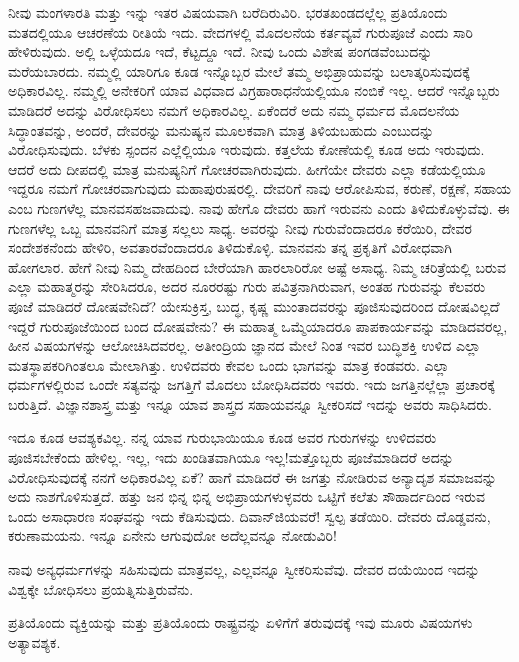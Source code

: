 ನೀವು ಮಂಗಳಾರತಿ ಮತ್ತು ಇನ್ನು ಇತರ ವಿಷಯವಾಗಿ ಬರೆದಿರುವಿರಿ. ಭರತಖಂಡದಲ್ಲೆಲ್ಲ ಪ್ರತಿಯೊಂದು ಮತದಲ್ಲಿಯೂ ಆಚರಣೆಯ ರೀತಿಯೆ ಇದು. ವೇದಗಳಲ್ಲಿ ಮೊದಲನೆಯ ಕರ್ತವ್ಯವೆ ಗುರುಪೂಜೆ ಎಂದು ಸಾರಿ ಹೇಳಿರುವುದು. ಅಲ್ಲಿ ಒಳ್ಳೆಯದೂ ಇದೆ, ಕೆಟ್ಟದ್ದೂ ಇದೆ. ನೀವು ಒಂದು ವಿಶೇಷ ಪಂಗಡವೆಂಬುದನ್ನು ಮರೆಯಬಾರದು. ನಮ್ಮಲ್ಲಿ ಯಾರಿಗೂ ಕೂಡ ಇನ್ನೊಬ್ಬರ ಮೇಲೆ ತಮ್ಮ ಅಭಿಪ್ರಾಯವನ್ನು ಬಲಾತ್ಕರಿಸು\-ವುದಕ್ಕೆ ಅಧಿಕಾರವಿಲ್ಲ. ನಮ್ಮಲ್ಲಿ ಅನೇಕರಿಗೆ ಯಾವ ವಿಧವಾದ ವಿಗ್ರಹಾರಾಧನೆಯಲ್ಲಿಯೂ ನಂಬಿಕೆ ಇಲ್ಲ. ಆದರೆ ಇನ್ನೊಬ್ಬರು ಮಾಡಿದರೆ ಅದನ್ನು ವಿರೋಧಿಸಲು ನಮಗೆ ಅಧಿಕಾರವಿಲ್ಲ. ಏಕೆಂದರೆ ಅದು ನಮ್ಮ ಧರ್ಮದ ಮೊದಲನೆಯ ಸಿದ್ಧಾಂತವನ್ನು, ಅಂದರೆ, ದೇವರನ್ನು ಮನುಷ್ಯನ ಮೂಲಕವಾಗಿ ಮಾತ್ರ ತಿಳಿಯಬಹುದು ಎಂಬುದನ್ನು ವಿರೋಧಿಸುವುದು. ಬೆಳಕು ಸ್ಪಂದನ ಎಲ್ಲೆಲ್ಲಿಯೂ ಇರುವುದು. ಕತ್ತಲೆಯ ಕೋಣೆಯಲ್ಲಿ ಕೂಡ ಅದು ಇರುವುದು. ಆದರೆ ಅದು ದೀಪದಲ್ಲಿ ಮಾತ್ರ ಮನುಷ್ಯನಿಗೆ ಗೋಚರವಾಗಿರುವುದು. ಹೀಗೆಯೇ ದೇವರು ಎಲ್ಲಾ ಕಡೆಯಲ್ಲಿಯೂ ಇದ್ದರೂ ನಮಗೆ ಗೋಚರವಾಗುವುದು ಮಹಾಪುರುಷರಲ್ಲಿ. ದೇವರಿಗೆ ನಾವು ಆರೋಪಿಸುವ, ಕರುಣೆ, ರಕ್ಷಣೆ, ಸಹಾಯ ಎಂಬ ಗುಣಗಳೆಲ್ಲ ಮಾನವಸಹಜವಾದುವು. ನಾವು ಹೇಗೊ ದೇವರು ಹಾಗೆ ಇರುವನು ಎಂದು ತಿಳಿದುಕೊಳ್ಳುವೆವು. ಈ ಗುಣಗಳೆಲ್ಲ ಒಬ್ಬ ಮಾನವನಿಗೆ ಮಾತ್ರ ಸಲ್ಲಲು ಸಾಧ್ಯ. ಅವರನ್ನು ನೀವು ಗುರುವೆಂದಾದರೂ ಕರೆಯಿರಿ, ದೇವರ ಸಂದೇಶಕನೆಂದು ಹೇಳಿರಿ, ಅವತಾರವೆಂದಾದರೂ ತಿಳಿದುಕೊಳ್ಳಿ. ಮಾನವನು ತನ್ನ ಪ್ರಕೃತಿಗೆ ವಿರೋಧವಾಗಿ ಹೋಗಲಾರ. ಹೇಗೆ ನೀವು ನಿಮ್ಮ ದೇಹದಿಂದ ಬೇರೆಯಾಗಿ ಹಾರಲಾರಿರೋ ಅಷ್ಟೆ ಅಸಾಧ್ಯ. ನಿಮ್ಮ ಚರಿತ್ರೆಯಲ್ಲಿ ಬರುವ ಎಲ್ಲಾ ಮಹಾತ್ಮರನ್ನು ಸೇರಿಸಿದರೂ, ಅದರ ನೂರರಷ್ಟು ಗುರು ಪವಿತ್ರನಾಗಿರುವಾಗ, ಅಂತಹ ಗುರುವನ್ನು ಕೆಲವರು ಪೂಜೆ ಮಾಡಿದರೆ ದೋಷವೇನಿದೆ? ಯೇಸುಕ್ರಿಸ್ತ, ಬುದ್ಧ, ಕೃಷ್ಣ ಮುಂತಾದವರನ್ನು ಪೂಜಿಸುವುದರಿಂದ ದೋಷವಿಲ್ಲದೆ ಇದ್ದರೆ ಗುರುಪೂಜೆಯಿಂದ ಬಂದ ದೋಷವೇನು? ಈ ಮಹಾತ್ಮ ಒಮ್ಮೆಯಾದರೂ ಪಾಪಕಾರ್ಯವನ್ನು ಮಾಡಿದವರಲ್ಲ, ಹೀನ ವಿಷಯಗಳನ್ನು ಆಲೋಚಿಸಿದವರಲ್ಲ. ಅತೀಂದ್ರಿಯ ಜ್ಞಾನದ ಮೇಲೆ ನಿಂತ ಇವರ ಬುದ್ಧಿಶಕ್ತಿ ಉಳಿದ ಎಲ್ಲಾ ಮತಸ್ಥಾಪಕರಿಗಿಂತಲೂ ಮೇಲಾಗಿತ್ತು. ಉಳಿದವರು ಕೇವಲ ಒಂದು ಭಾಗವನ್ನು ಮಾತ್ರ ಕಂಡವರು. ಎಲ್ಲಾ ಧರ್ಮಗಳಲ್ಲಿರುವ ಒಂದೇ ಸತ್ಯವನ್ನು ಜಗತ್ತಿಗೆ ಮೊದಲು ಬೋಧಿಸಿದವರು ಇವರು. ಇದು ಜಗತ್ತಿನಲ್ಲೆಲ್ಲಾ ಪ್ರಚಾರಕ್ಕೆ ಬರುತ್ತಿದೆ. ವಿಜ್ಞಾನಶಾಸ್ತ್ರ ಮತ್ತು ಇನ್ನೂ ಯಾವ ಶಾಸ್ತ್ರದ ಸಹಾಯವನ್ನೂ ಸ್ವೀಕರಿಸದೆ ಇದನ್ನು ಅವರು ಸಾಧಿಸಿದರು.

ಇದೂ ಕೂಡ ಆವಶ್ಯಕವಿಲ್ಲ. ನನ್ನ ಯಾವ ಗುರುಭಾಯಿಯೂ ಕೂಡ ಅವರ ಗುರುಗಳನ್ನು ಉಳಿದವರು ಪೂಜಿಸಬೇಕೆಂದು ಹೇಳಿಲ್ಲ. ಇಲ್ಲ, ಇದು ಖಂಡಿತವಾಗಿಯೂ ಇಲ್ಲ!ಮತ್ತೊಬ್ಬರು ಪೂಜೆಮಾಡಿದರೆ ಅದನ್ನು ವಿರೋಧಿಸುವುದಕ್ಕೆ ನನಗೆ ಅಧಿಕಾರವಿಲ್ಲ ಏಕೆ? ಹಾಗೆ ಮಾಡಿದರೆ ಈ ಜಗತ್ತು ನೋಡಿರುವ ಅನ್ಯಾದೃಶ ಸಮಾಜವನ್ನು ಅದು ನಾಶಗೊಳಿಸುತ್ತದೆ. ಹತ್ತು ಜನ ಭಿನ್ನ ಭಿನ್ನ ಅಭಿಪ್ರಾಯಗಳುಳ್ಳವರು ಒಟ್ಟಿಗೆ ಕಲೆತು ಸೌಹಾರ್ದದಿಂದ ಇರುವ ಒಂದು ಅಸಾಧಾರಣ ಸಂಘವನ್ನು ಇದು ಕೆಡಿಸುವುದು. ದಿವಾನ್‌ಜಿಯವರೆ! ಸ್ವಲ್ಪ ತಡೆಯಿರಿ. ದೇವರು ದೊಡ್ಡವನು, ಕರುಣಾಮಯನು. ಇನ್ನೂ ಏನೇನು ಆಗುವುದೋ ಅದೆಲ್ಲವನ್ನೂ ನೋಡುವಿರಿ!
\vfill \eject

ನಾವು ಅನ್ಯಧರ್ಮಗಳನ್ನು ಸಹಿಸುವುದು ಮಾತ್ರವಲ್ಲ, ಎಲ್ಲವನ್ನೂ ಸ್ವೀಕರಿಸುವೆವು. ದೇವರ ದಯೆಯಿಂದ ಇದನ್ನು ವಿಶ್ವಕ್ಕೇ ಬೋಧಿಸಲು ಪ್ರಯತ್ನಿಸುತ್ತಿರುವೆನು.

ಪ್ರತಿಯೊಂದು ವ್ಯಕ್ತಿಯನ್ನು ಮತ್ತು ಪ್ರತಿಯೊಂದು ರಾಷ್ಟ್ರವನ್ನು ಏಳಿಗೆಗೆ ತರುವುದಕ್ಕೆ ಇವು ಮೂರು ವಿಷಯಗಳು ಅತ್ಯಾವಶ್ಯಕ.

